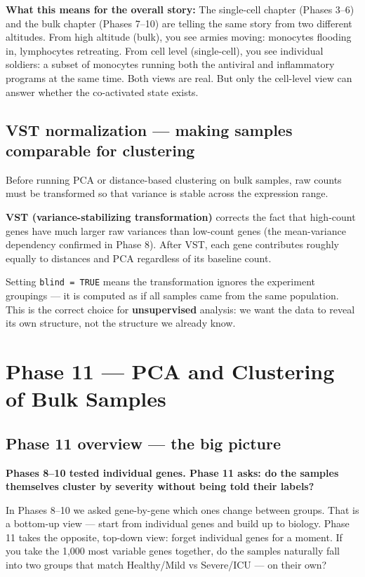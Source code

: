 \documentclass[11pt, a4paper]{article}
\begin{document}
\textbf{What this means for the overall story:}
The single-cell chapter (Phases 3--6) and the bulk chapter (Phases 7--10)
are telling the same story from two different altitudes.
From high altitude (bulk), you see armies moving: monocytes flooding in,
lymphocytes retreating. From cell level (single-cell), you see individual
soldiers: a subset of monocytes running both the antiviral and inflammatory
programs at the same time. Both views are real. But only the cell-level
view can answer whether the co-activated state exists.

\subsection{VST normalization — making samples comparable for clustering}

Before running PCA or distance-based clustering on bulk samples, raw counts must
be transformed so that variance is stable across the expression range.

\textbf{VST (variance-stabilizing transformation)} corrects the fact that
high-count genes have much larger raw variances than low-count genes
(the mean-variance dependency confirmed in Phase 8). After VST, each gene
contributes roughly equally to distances and PCA regardless of its baseline count.

Setting \texttt{blind = TRUE} means the transformation ignores the experiment
groupings — it is computed as if all samples came from the same population.
This is the correct choice for \textbf{unsupervised} analysis: we want the
data to reveal its own structure, not the structure we already know.

\section{Phase 11 — PCA and Clustering of Bulk Samples}

\subsection{Phase 11 overview — the big picture}

\textbf{Phases 8--10 tested individual genes. Phase 11 asks: do the samples
themselves cluster by severity without being told their labels?}

In Phases 8--10 we asked gene-by-gene which ones change between groups.
That is a bottom-up view — start from individual genes and build up to biology.
Phase 11 takes the opposite, top-down view: forget individual genes for a moment.
If you take the 1,000 most variable genes together, do the samples naturally
fall into two groups that match Healthy/Mild vs Severe/ICU — on their own?
\end{document}
